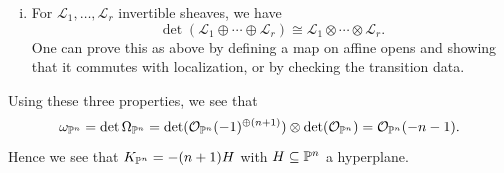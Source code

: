 \begin{example}
\begin{enumerate}
\begin{enumerate}[i)]
          \pagebreak
          To see this, note that given
          a short exact sequence of
          free $R$-modules
          \[
            \begin{tikzcd}
              0 \ar[r] & E \ar[r] & F \ar[r] & G \ar[r] & 0
            \end{tikzcd}
          \]
          of ranks $e, f, g$ for some
          ring $R$,
          we can define a map
          \begin{align*}
            \det(E) \otimes \det(G) &\longrightarrow \det(F) \\
            (v_1 \wedge \cdots \wedge v_e) \otimes (\overline{w}_1 \wedge \cdots \wedge \overline{w}_g) &\longmapsto v_1 \wedge \cdots \wedge v_e \wedge w_1 \wedge \cdots \wedge w_g,
          \end{align*}
          where we think of $G = F / E$.
          One can check that this is
          well-defined, is an isomorphism
          (it is enough to check this on
          a basis), and commutes with
          localization. This induces a
          morphism
          \[
            \det(\mathcal{F})|_U
            \longrightarrow
            \det(\mathcal{E})|_U \otimes \det(\mathcal{G})|_U
          \]
          on $U \subseteq X$ open affine
          which trivializes
          $\mathcal{E}, \mathcal{F}, \mathcal{G}$.
          Since the map commutes
          with localization, these morphisms
          glue to give an isomorphism
          $\det(\mathcal{F}) \to \det(\mathcal{E}) \otimes \det(\mathcal{G})$.
        \item For $\mathcal{L}_1, \dots, \mathcal{L}_r$
          invertible sheaves, we have
          \[
            \det(\mathcal{L}_1 \oplus \cdots \oplus \mathcal{L}_r)
            \cong \mathcal{L}_1 \otimes \cdots \otimes \mathcal{L}_r.
          \]
          One can prove this as above
          by defining a map on affine opens
          and showing that it commutes with
          localization, or by checking the
          transition data.
      \end{enumerate}
      Using these three properties, we see
      that
      \[
        \omega_{\mathbb{P}^n}
        = \det \Omega_{\mathbb{P}^n}
        = \det(\mathcal{O}_{\mathbb{P}^n}(-1)^{\oplus (n + 1)})
        \otimes \det(\mathcal{O}_{\mathbb{P}^n})
        = \mathcal{O}_{\mathbb{P}^n}(-n - 1).
      \]
      Hence we see that $K_{\mathbb{P}^n} = -(n + 1) H$
      with $H \subseteq \mathbb{P}^n$ a
      hyperplane.
  \end{enumerate}
\end{example}

